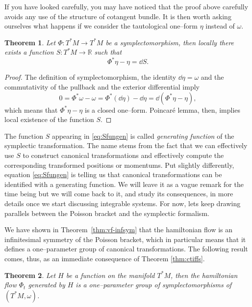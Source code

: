 \documentclass[english,fontsize=11pt,paper=b5]{scrbook}
\newtheorem{theorem}{Theorem}[chapter]
\theoremstyle{definition}
\begin{document}
    If you have looked carefully, you may have noticed that the proof above carefully avoids any use of the structure of cotangent bundle.
    It is then worth asking ourselves what happens if we consider the tautological one--form $\eta$ instead of $\omega$.

    \begin{theorem}\label{thm:genfun}
      Let $\Phi: T^*M \to T^*M$ be a symplectomorphism, then locally there exists a function $S:T^*M\to\mathbb{R}$ such that
      \begin{equation}\label{eq:Sfungen}
        \Phi^*\eta - \eta = \dd S.
      \end{equation}
    \end{theorem}
    \begin{proof}
      The definition of symplectomorphism, the identity $\dd\eta = \omega$ and the commutativity of the pullback and the exterior differential imply
      \begin{equation}
        0 = \Phi^*\omega - \omega = \Phi^*(\dd\eta) - \dd\eta = \dd(\Phi^*\eta - \eta),
      \end{equation}
      which means that $\Phi^*\eta - \eta$ is a closed one--form.
      Poincar\'e lemma, then, implies local existence of the function $S$.
    \end{proof}

    The function $S$ appearing in \eqref{eq:Sfungen} is called \emph{generating function} of the symplectic transformation.
    The name stems from the fact that we can effectively use $S$ to construct canonical transformations and effectively compute the corresponding transformed positions or momentums.
    Put slightly differently, equation \eqref{eq:Sfungen} is telling us that canonical transformations can be identified with a generating function.
    We will leave it as a vague remark for the time being but we will come back to it, and study its consequences, in more details once we start discussing integrable systems.
    For now, lets keep drawing parallels between the Poisson bracket and the symplectic formalism.

    We have shown in Theorem~\ref{thm:vf-infsym} that the hamiltonian flow is an infinitesimal symmetry of the Poisson bracket, which in particular means that it defines a one--parameter group of canonical transformations.
    The following result comes, thus, as an immediate consequence of Theorem \ref{thm:ctiffs}.

    \begin{theorem}
      Let $H$ be a function on the manifold $T^*M$, then the hamiltonian flow $\Phi_t$ generated by $H$ is a one--parameter group of symplectomorphisms of $(T^*M, \omega)$.
    \end{theorem}
\end{document}
